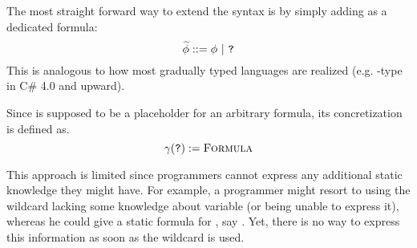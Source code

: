 
The most straight forward way to extend the syntax is by simply adding \qm as a dedicated formula:
\begin{displaymath}
\widetilde{\phi} ::= \phi ~|~ \texttt{?}
\end{displaymath}
This is analogous to how most gradually typed languages are realized (e.g. -type in C\# 4.0 and upward).

Since \qm is supposed to be a placeholder for an arbitrary formula, its concretization is defined as.
\begin{displaymath}
\gamma(\texttt{?}) := \textsc{Formula}
\end{displaymath}

This approach is limited since programmers cannot express any additional static knowledge they might have.
For example, a programmer might resort to using the wildcard lacking some knowledge about variable  (or being unable to express it), whereas he could give a static formula for , say .
Yet, there is no way to express this information as soon as the wildcard is used.